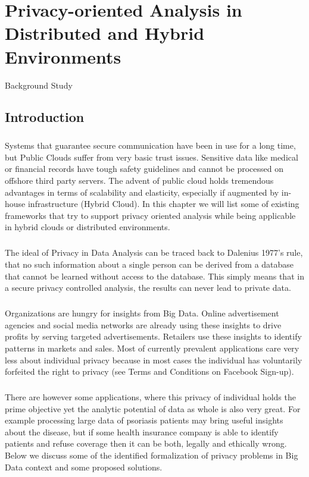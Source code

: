 \documentclass[12pt]{report}
\theoremstyle{named}
\begin{document}
\chapter{Privacy-oriented Analysis in Distributed and Hybrid Environments}{Background Study}
\section{Introduction}
\paragraph{}
Systems that guarantee secure communication have been in use for a long time, but Public Clouds suffer from very basic trust issues. Sensitive data like medical or financial records have tough safety guidelines and cannot be processed on offshore third party servers. The advent of public cloud holds tremendous advantages in terms of scalability and elasticity, especially if augmented by in-house infrastructure (Hybrid Cloud). In this chapter we will list some of existing frameworks that try to support privacy oriented analysis while being applicable in hybrid clouds or distributed environments.
\paragraph{}
The ideal of Privacy in Data Analysis can be traced back to Dalenius 1977’s \cite{dalenius1977} rule, that no such information about a single person can be derived from a database that cannot be learned without access to the database. This simply means that in a secure privacy controlled analysis, the results can never lead to private data.
\paragraph{}
Organizations are hungry for insights from Big Data. Online advertisement agencies and social media networks are already using these insights to drive profits by serving targeted advertisements. Retailers use these insights to identify patterns in markets and sales. Most of currently prevalent applications care very less about individual privacy because in most cases the individual has voluntarily forfeited the right to privacy (see Terms and Conditions on Facebook Sign-up).
\paragraph{}
There are however some applications, where this privacy of individual holds the prime objective yet the analytic potential of data as whole is also very great. For example processing large data of psoriasis patients may bring useful insights about the disease, but if some health insurance company is able to identify patients and refuse coverage then it can be both, legally and ethically wrong. 
Below we discuss some of the identified formalization of privacy problems in Big Data context and some proposed solutions.
\end{document}
